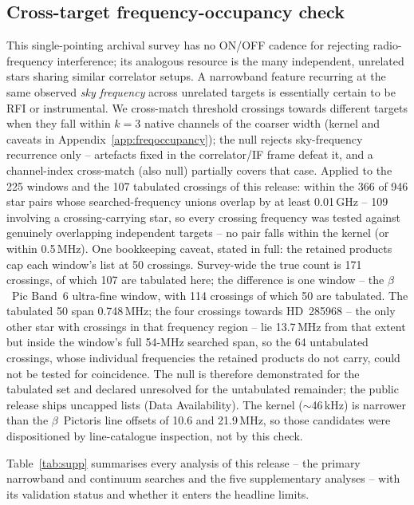 \documentclass{openjournal}
\begin{document}
\subsection{Cross-target frequency-occupancy check}
\label{sec:freqoccupancy}

This single-pointing archival survey has no ON/OFF cadence for
rejecting radio-frequency interference; its analogous resource is the
many independent, unrelated stars sharing similar correlator setups. A
narrowband feature recurring at the same observed \emph{sky frequency}
across unrelated targets is essentially certain to be RFI or
instrumental. We cross-match threshold crossings towards different
targets when they fall within $k=3$ native channels of the coarser
width (kernel and caveats in Appendix~\ref{app:freqoccupancy}); the
null rejects sky-frequency recurrence only -- artefacts fixed in the
correlator/IF frame defeat it, and a channel-index cross-match (also
null) partially covers that case. Applied to the 225 windows and the
107 tabulated crossings of this release: within the 366 of 946 star
pairs whose searched-frequency unions overlap by at least 0.01\,GHz --
109 involving a crossing-carrying star, so every crossing frequency
was tested against genuinely overlapping independent targets -- no
pair falls within the kernel (or within 0.5\,MHz). One bookkeeping
caveat, stated in full: the retained products cap each window's list
at 50 crossings. Survey-wide the true count is 171 crossings, of
which 107 are tabulated here; the difference is one window -- the
$\beta$~Pic Band~6 ultra-fine window, with 114 crossings of which 50
are tabulated. The tabulated 50 span 0.748\,MHz; the four crossings
towards HD~285968 -- the only other star with crossings in that
frequency region -- lie 13.7\,MHz from that extent but inside the
window's full 54-MHz searched span, so the 64 untabulated crossings,
whose individual frequencies the retained products do not carry,
could not be tested for coincidence. The null is therefore
demonstrated for the tabulated set and declared unresolved for the
untabulated remainder; the public release ships uncapped lists (Data
Availability). The kernel ($\sim$46\,kHz) is narrower than the
$\beta$~Pictoris line offsets of 10.6 and 21.9\,MHz, so those
candidates were dispositioned by line-catalogue inspection, not by
this check.

Table~\ref{tab:supp} summarises every analysis of this release -- the
primary narrowband and continuum searches and the five supplementary
analyses -- with its validation status and whether it enters the
headline limits.
\end{document}
